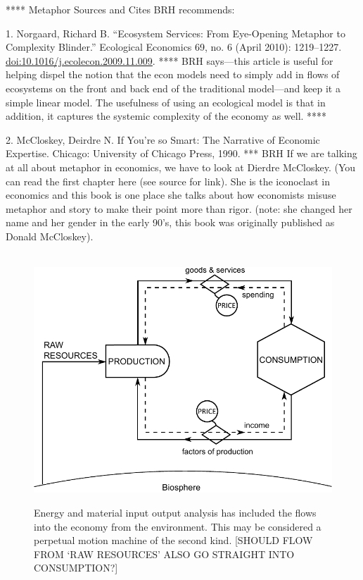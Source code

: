 **** Metaphor Sources and Cites BRH recommends:


1. Norgaard, Richard B. “Ecosystem Services: From Eye-Opening Metaphor to Complexity Blinder.” Ecological Economics 69, no. 6 (April 2010): 1219--1227. \url{doi:10.1016/j.ecolecon.2009.11.009}. **** BRH says---this article is useful for helping dispel the notion that the econ models need to simply 
add in flows of ecosystems on the front and back end of the traditional model---and keep it a simple linear model. The usefulness
of using an ecological model is that in addition, it captures the systemic complexity of the economy as well. ****


2. McCloskey, Deirdre N. If You’re so Smart: The Narrative of Economic Expertise. Chicago: University of Chicago Press, 1990. *** BRH 
If we are talking at all about metaphor in economics, we have to look at Dierdre McCloskey. (You can read the first chapter here (see source for link).
She is 
the iconoclast in economics and this book is one place she talks about how economists misuse
metaphor and story to make their point more than rigor. (note: she changed her
name and her gender in the early 90's, this book was originally published as Donald McCloskey).


\begin{figure}[!ht]
\centering\
\includegraphics[width=\linewidth]{Part_0/Chapter_Introduction/images/Perpetual_motion_2.pdf}
\caption[The traditional model supplemented with resource inputs]{Energy 
and material input output analysis has included the flows into the economy from the environment.
This may be considered a perpetual motion machine 
of the second kind.
[SHOULD FLOW FROM `RAW RESOURCES' ALSO GO STRAIGHT INTO CONSUMPTION?]}
\label{fig:perp_motion_2}
\end{figure}

